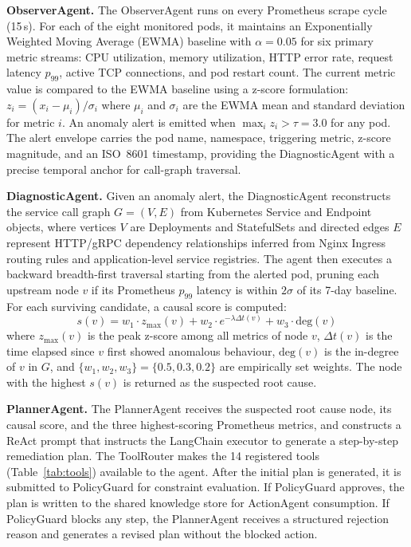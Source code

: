 \documentclass[journal,10pt,twoside]{IEEEtran}
\begin{document}
\textbf{ObserverAgent.}
The ObserverAgent runs on every Prometheus scrape cycle (15\,s). For
each of the eight monitored pods, it maintains an Exponentially Weighted
Moving Average (EWMA) baseline with $\alpha = 0.05$ for six primary
metric streams: CPU utilization, memory utilization, HTTP error rate,
request latency $p_{99}$, active TCP connections, and pod restart count.
The current metric value is compared to the EWMA baseline using a
z-score formulation: $z_i = (x_i - \mu_i) / \sigma_i$ where $\mu_i$
and $\sigma_i$ are the EWMA mean and standard deviation for metric $i$.
An anomaly alert is emitted when $\max_i z_i > \tau = 3.0$ for any pod.
The alert envelope carries the pod name, namespace, triggering metric,
z-score magnitude, and an ISO~8601 timestamp, providing the DiagnosticAgent
with a precise temporal anchor for call-graph traversal.

\textbf{DiagnosticAgent.}
Given an anomaly alert, the DiagnosticAgent reconstructs the service
call graph $G = (V, E)$ from Kubernetes Service and Endpoint objects,
where vertices $V$ are Deployments and StatefulSets and directed edges
$E$ represent HTTP/gRPC dependency relationships inferred from
Nginx Ingress routing rules and application-level service registries.
The agent then executes a backward breadth-first traversal starting from
the alerted pod, pruning each upstream node $v$ if its Prometheus
$p_{99}$ latency is within $2\sigma$ of its 7-day baseline. For each
surviving candidate, a causal score is computed:
\begin{equation}
  s(v) = w_1 \cdot z_{\max}(v) + w_2 \cdot e^{-\lambda \Delta t(v)}
         + w_3 \cdot \text{deg}(v) \label{eq:causal}
\end{equation}
where $z_{\max}(v)$ is the peak z-score among all metrics of node $v$,
$\Delta t(v)$ is the time elapsed since $v$ first showed anomalous
behaviour, $\text{deg}(v)$ is the in-degree of $v$ in $G$, and
$\{w_1, w_2, w_3\} = \{0.5, 0.3, 0.2\}$ are empirically set weights.
The node with the highest $s(v)$ is returned as the suspected root cause.

\textbf{PlannerAgent.}
The PlannerAgent receives the suspected root cause node, its causal
score, and the three highest-scoring Prometheus metrics, and constructs
a ReAct prompt that instructs the LangChain executor to generate a
step-by-step remediation plan. The ToolRouter makes the 14 registered
tools (Table~\ref{tab:tools}) available to the agent. After the initial
plan is generated, it is submitted to PolicyGuard for constraint
evaluation. If PolicyGuard approves, the plan is written to the shared
knowledge store for ActionAgent consumption. If PolicyGuard blocks any
step, the PlannerAgent receives a structured rejection reason and
generates a revised plan without the blocked action.
\end{document}
